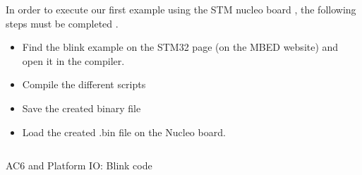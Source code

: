 \documentclass[a4paper, 11pt, openany, oneside, english]{book}
\newcommand{\inputmintedcpp}[1]{
\inputminted[style=fruity,%
             linenos=true,
             firstnumber=1,
             bgcolor=black, %
]{cpp}{#1}
}
\begin{document}
In order to execute our first example using the STM nucleo board , the following steps must be completed .



\begin{itemize}
    \item Find the blink example on the STM32 page (on the MBED website) and open it in the compiler. 
    \item Compile the different scripts 
    \item Save the created binary file
    \item Load the created .bin file on the Nucleo board.
\end{itemize}
\newpage




\begin{listing}[!ht]
\inputminted[style=fruity, linenos=true, bgcolor=black, firstline=62, lastline=86]{cpp}{code_snippets/ac6-blink.cpp}
\caption{AC6 and Platform IO: Blink code\label{listing:ac6_PIO-Blink_code}}
\end{listing}
\end{document}
